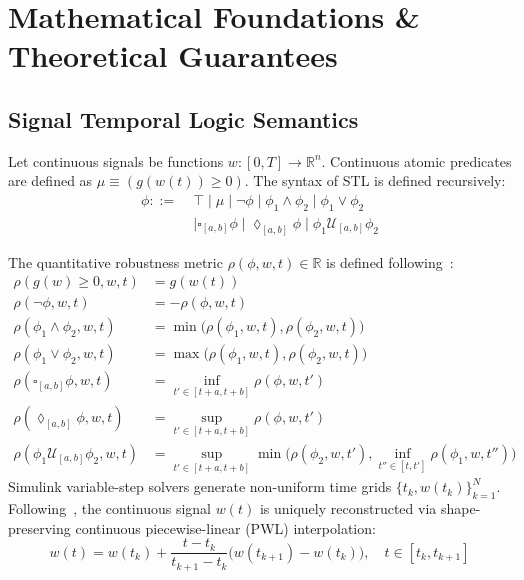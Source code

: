 \documentclass[journal]{IEEEtran}
\begin{document}
\section{Mathematical Foundations \& Theoretical Guarantees}

\subsection{Signal Temporal Logic Semantics}
Let continuous signals be functions $w: [0, T] \to \mathbb{R}^n$. Continuous atomic predicates are defined as $\mu \equiv (g(w(t)) \ge 0)$. The syntax of STL is defined recursively:
\begin{align}
\phi ::= \;&\top \mid \mu \mid \neg \phi \mid \phi_1 \land \phi_2 \mid \phi_1 \lor \phi_2 \nonumber \\
&\mid \square_{[a, b]} \phi \mid \lozenge_{[a, b]} \phi \mid \phi_1 \mathcal{U}_{[a, b]} \phi_2
\end{align}

\noindent The quantitative robustness metric $\rho(\phi, w, t) \in \mathbb{R}$ is defined following~\cite{fainekos2009robustness,donze2010breach}:
\begin{align}
\rho(g(w) \ge 0, w, t) &= g(w(t)) \\
\rho(\neg \phi, w, t) &= -\rho(\phi, w, t) \\
\rho(\phi_1 \land \phi_2, w, t) &= \min\big(\rho(\phi_1, w, t), \rho(\phi_2, w, t)\big) \\
\rho(\phi_1 \lor \phi_2, w, t) &= \max\big(\rho(\phi_1, w, t), \rho(\phi_2, w, t)\big) \\
\rho(\square_{[a,b]} \phi, w, t) &= \inf_{t' \in [t+a, t+b]} \rho(\phi, w, t') \\
\rho(\lozenge_{[a,b]} \phi, w, t) &= \sup_{t' \in [t+a, t+b]} \rho(\phi, w, t') \\
\rho(\phi_1 \mathcal{U}_{[a,b]} \phi_2, w, t) &= \sup_{t' \in [t+a, t+b]} \min\Big(\rho(\phi_2, w, t'), \inf_{t'' \in [t, t']} \rho(\phi_1, w, t'')\Big)
\end{align}
Simulink variable-step solvers generate non-uniform time grids $\{t_k, w(t_k)\}_{k=1}^N$. Following~\cite{donze2010breach}, the continuous signal $w(t)$ is uniquely reconstructed via shape-preserving continuous piecewise-linear (PWL) interpolation:
\begin{equation}
\label{eq:pwl_interpolation}
w(t) = w(t_k) + \frac{t - t_k}{t_{k+1} - t_k} \big(w(t_{k+1}) - w(t_k)\big), \quad t \in [t_k, t_{k+1}]
\end{equation}
\end{document}
